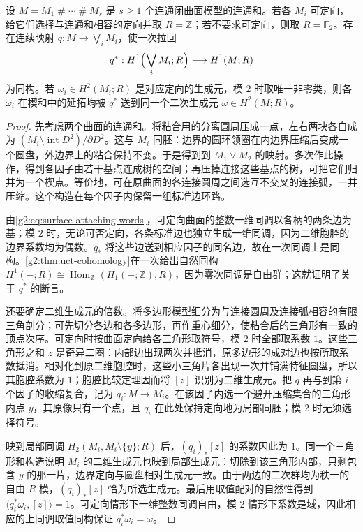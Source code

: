 \begin{lemma}\label{g2:lem:surface-pinch-cohomology}
	设 \(M=M_1\mathbin{\#}\cdots\mathbin{\#}M_s\) 是 \(s\geq1\) 个连通闭曲面模型的连通和。若各 \(M_i\) 可定向，给它们选择与连通和相容的定向并取 \(R=\mathbb Z\)；若不要求可定向，则取 \(R=\mathbb F_2\)。存在连续映射 \(q:M\to\bigvee_iM_i\)，使一次拉回
	\[
		q^*:H^1\Bigl(\bigvee_iM_i;R\Bigr)\longrightarrow H^1(M;R)
	\]
	为同构。若 \(\omega_i\in H^2(M_i;R)\) 是对应定向的生成元，模 \(2\) 时取唯一非零类，则各 \(\omega_i\) 在楔和中的延拓均被 \(q^*\) 送到同一个二次生成元 \(\omega\in H^2(M;R)\)。
\end{lemma}
\begin{proof}
	先考虑两个曲面的连通和。将粘合用的分离圆周压成一点，左右两块各自成为 \((M_i\setminus\operatorname{int}D^2)/\partial D^2\)。这与 \(M_i\) 同胚：边界的圆环领圈在内边界压缩后变成一个圆盘，外边界上的粘合保持不变。于是得到到 \(M_1\vee M_2\) 的映射。多次作此操作，得到各因子由若干基点连成树的空间；再压掉连接这些基点的树，可把它们归并为一个楔点。等价地，可在原曲面的各连接圆周之间选互不交叉的连接弧，一并压缩。这个构造在每个因子内保留一组标准边环路。

	由\eqref{g2:eq:surface-attaching-words}，可定向曲面的整数一维同调以各柄的两条边为基；模 \(2\) 时，无论可否定向，各条标准边也独立生成一维同调，因为二维胞腔的边界系数均为偶数。\(q_*\) 将这些边送到相应因子的同名边，故在一次同调上是同构。\cref{g2:thm:uct-cohomology}在一次给出自然同构 \(H^1(-;R)\cong\operatorname{Hom}_{\mathbb Z}(H_1(-;\mathbb Z),R)\)，因为零次同调是自由群；这就证明了关于 \(q^*\) 的断言。

	还要确定二维生成元的倍数。将多边形模型细分为与连接圆周及连接弧相容的有限三角剖分；可先切分各边和各多边形，再作重心细分，使粘合后的三角形有一致的顶点次序。可定向时按曲面定向给各三角形取符号，模 \(2\) 时全部取系数 \(1\)。这些三角形之和 \(z\) 是奇异二圈：内部边出现两次并抵消，原多边形的成对边也按所取系数抵消。相对化到原二维胞腔时，这些小三角片各出现一次并铺满特征圆盘，所以其胞腔系数为 \(1\)；胞腔比较定理因而将 \([z]\) 识别为二维生成元。把 \(q\) 再与到第 \(i\) 个因子的收缩复合，记为 \(q_i:M\to M_i\)。在该因子内选一个避开压缩集合的三角形内点 \(y\)，其原像只有一个点，且 \(q_i\) 在此处保持定向地为局部同胚；模 \(2\) 时无须选择符号。

	映到局部同调 \(H_2(M_i,M_i\setminus\{y\};R)\) 后，\((q_i)_*[z]\) 的系数因此为 \(1\)。同一个三角形和构造说明 \(M_i\) 的二维生成元也映到局部生成元：切除到该三角形内部，只剩包含 \(y\) 的那一片，边界定向与圆盘相对生成元一致。由于两边的二次群均为秩一的自由 \(R\) 模，\((q_i)_*[z]\) 恰为所选生成元。最后用取值配对的自然性得到 \(\langle q_i^*\omega_i,[z]\rangle=1\)。可定向情形下一维整数同调自由，模 \(2\) 情形下系数是域，因此相应的上同调取值同构保证 \(q_i^*\omega_i=\omega\)。
\end{proof}

